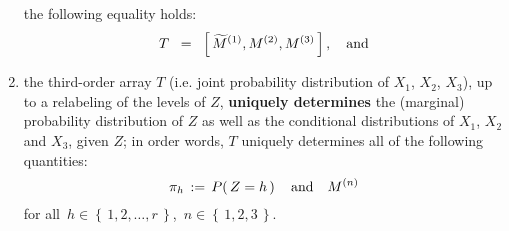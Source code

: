 \begin{corollary}
\begin{enumerate}
	the following equality holds:
	\begin{equation*}
	T \;\; = \;\; \left[\,\widetilde{M}^{(1)},M^{(2)},M^{(3)}\,\right],
	\quad
	\textnormal{and}
	\end{equation*}
\item
	the third-order array $T$ (i.e. joint probability distribution of $X_{1}$, $X_{2}$, $X_{3}$),
	up to a relabeling of the levels of $Z$, \textbf{uniquely determines} the (marginal)
	probability distribution of $Z$ as well as the conditional distributions of
	$X_{1}$, $X_{2}$ and $X_{3}$, given $Z$;
	in order words, $T$ uniquely determines all of the following quantities:
	\begin{equation*}
	\pi_{h} \,:=\, P\!\left(\,Z = h\,\right)
	\quad\textnormal{and}\quad
	M^{(n)}
	\end{equation*}
	for all \,$h \in \left\{\,1,2,\ldots,r\,\right\}$, \,$n \in \left\{\,1,2,3\,\right\}$.
\end{enumerate}
\end{corollary}
\proof
